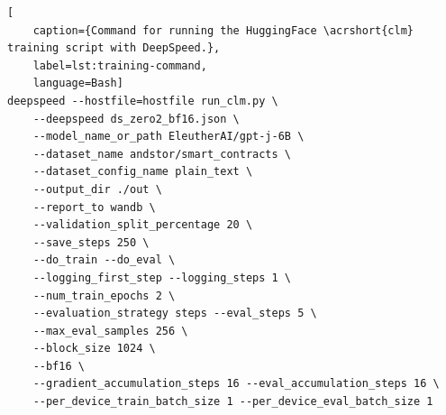 \begin{lstlisting}[
    caption={Command for running the HuggingFace \acrshort{clm} training script with DeepSpeed.},
    label=lst:training-command,
    language=Bash]
deepspeed --hostfile=hostfile run_clm.py \
    --deepspeed ds_zero2_bf16.json \
    --model_name_or_path EleutherAI/gpt-j-6B \
    --dataset_name andstor/smart_contracts \
    --dataset_config_name plain_text \
    --output_dir ./out \
    --report_to wandb \
    --validation_split_percentage 20 \
    --save_steps 250 \
    --do_train --do_eval \
    --logging_first_step --logging_steps 1 \
    --num_train_epochs 2 \
    --evaluation_strategy steps --eval_steps 5 \
    --max_eval_samples 256 \
    --block_size 1024 \
    --bf16 \
    --gradient_accumulation_steps 16 --eval_accumulation_steps 16 \
    --per_device_train_batch_size 1 --per_device_eval_batch_size 1
\end{lstlisting}

